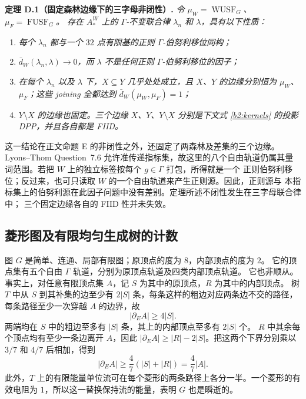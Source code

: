 \documentclass[UTF8,zihao=-4,a4paper]{ctexart}
\numberwithin{equation}{section}
\begin{document}
\medskip
{}\noindent\textbf{定理 D.1（固定森林边缘下的三字母非闭性）.}
\emph{令 $\mu_W=\operatorname{WUSF}_G$、$\mu_F=\operatorname{FUSF}_G$。
存在 $A_*^W$ 上的 $\Gamma$-不变联合律 $\lambda_n$ 和 $\lambda$，具有以下性质：}
\begin{enumerate}
 \item \emph{每个 $\lambda_n$ 都与一个 $32$ 点有限基的正则 $\Gamma$-伯努利移位同构；}
 \item \emph{$\bar d_W(\lambda_n,\lambda)\longrightarrow0$，而 $\lambda$ 不是任何正则
 $\Gamma$-伯努利移位的因子；}
 \item \emph{在每个 $\lambda_n$ 以及 $\lambda$ 下，$X\subseteq Y$ 几乎处处成立，且
 $X$、$Y$ 的边缘分别恒为 $\mu_W$、$\mu_F$；这些 joining 全都达到
 $\bar d_W(\mu_W,\mu_F)=1$；}
 \item \emph{$Y\setminus X$ 的边缘也固定。三个边缘 $X$、$Y$、$Y\setminus X$
 分别是下文式 \eqref{b2:kernels} 的投影 DPP，并且各自都是 FIID。}
\end{enumerate}

这一结论在正文命题 E 的非闭性之外，还固定了两森林及差集的三个边缘。
Lyons--Thom Question~7.6 允许准传递指标集，故这里的八个自由轨道仍属其量词范围。若把 $W$ 上的独立标签按每个 $g\in\Gamma$ 打包，所得就是一个
正则伯努利移位；反过来，也可只读取 $W$ 的一个自由轨道来产生正则源。因此，正则源与
本指标集上的伯努利源在此因子问题中没有差别。定理所述不闭性发生在三字母联合律中；
三个固定边缘各自的 FIID 性并未失效。

\subsection{菱形图及有限均匀生成树的计数}\label{b2:finite}

图 $G$ 是简单、连通、局部有限图；原顶点的度为 $8$，内部顶点的度为 $2$。
它的顶点集有五个自由 $\Gamma$ 轨道，分别为原顶点轨道及四类内部顶点轨道。
它也非顺从。事实上，对任意有限顶点集 $A$，记 $S$ 为其中的原顶点，$R$ 为其中的内部顶点。
树 $T$ 中从 $S$ 到其补集的边至少有 $2|S|$ 条，每条这样的粗边对应两条边不交的路径，
每条路径至少一次穿越 $A$ 的边界，故
\[
 |\partial_E A|\ge4|S|.
\]
两端均在 $S$ 中的粗边至多有 $|S|$ 条，其上的内部顶点至多有 $2|S|$ 个。
$R$ 中其余每个顶点均有至少一条边离开 $A$，因此
$|\partial_E A|\ge |R|-2|S|$。把这两个下界分别乘以 $3/7$ 和 $4/7$ 后相加，得到
\begin{equation}\label{b2:cheeger}
 |\partial_E A|\ge \frac47(|S|+|R|)=\frac47|A|.
\end{equation}
此外，$T$ 上的有限能量单位流可在每个菱形的两条路径上各分一半。一个菱形的有效电阻为
$1$，所以这一替换保持流的能量，表明 $G$ 也是瞬逝的。
\end{document}
